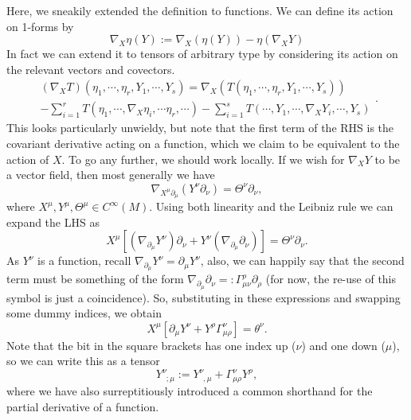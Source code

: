 \documentclass[11pt,fleqn]{report}
\begin{document}
Here, we sneakily extended the definition to functions. We can define its action on 1-forms by\begin{equation}
\nabla_X\eta(Y) := \nabla_X(\eta(Y))-\eta(\nabla_XY)
\end{equation}  In fact we can extend it to tensors of arbitrary type by considering its action on the relevant vectors and covectors.\begin{equation}\label{TheBigUn}
\begin{split}
(\nabla_XT)(\eta_1,\cdots,\eta_r,Y_1,\cdots,Y_s)=\nabla_X(T(\eta_1,\cdots,\eta_r,Y_1,\cdots,Y_s))\\ 
-\sum_{i=1}^rT(\eta_1,\cdots,\nabla_X\eta_i,\cdots\eta_r,\cdots) - \sum_{i=1}^sT(\cdots,Y_1,\cdots,\nabla_XY_i,\cdots,Y_s)
\end{split}.
\end{equation}
This looks particularly unwieldy, but note that the first term of the RHS is the covariant derivative acting on a function, which we claim to be equivalent to the action of $X$. To go any further, we should work locally. If we wish for $\nabla_XY$ to be a vector field, then most generally we have\begin{equation}
\nabla_{X^\mu\partial_\mu}(Y^\nu\partial_\nu) = \Theta^\nu \partial_\nu,
\end{equation}
where $X^\mu,Y^\mu,\Theta^\mu \in C^\infty(M)$. Using both linearity and the Leibniz rule we can expand the LHS as\begin{equation}
X^\mu\left[(\nabla_{\partial_\mu}Y^\nu)\partial_\nu +Y^\nu(\nabla_{\partial_\mu}\partial_\nu)\right] = \Theta^\nu\partial_\nu.
\end{equation}
As $Y^\nu$ is a function, recall $\nabla_{\partial_\mu}Y^\nu=\partial_\mu Y^\nu$, also, we can happily say that the second term must be something of the form $\nabla_{\partial_\mu}\partial_\nu=:\Gamma_{\mu\nu}^\rho\partial_\rho$ (for now, the re-use of this symbol is just a coincidence). So, substituting in these expressions and swapping some dummy indices, we obtain \begin{equation}
X^\mu\left[\partial_\mu Y^\nu+Y^\rho\Gamma^\nu_{\mu\rho}\right] = \theta^\nu.
\end{equation}
Note that the bit in the square brackets has one index up ($\nu$) and one down ($\mu$), so we can write this as a tensor\begin{equation}
Y^\nu_{\phantom\nu;\mu}:=Y^\nu_{\phantom v ,\mu}+\Gamma^\nu_{\mu\rho}Y^\rho,
\end{equation}
where we have also surreptitiously introduced a common shorthand for the partial derivative of a function.
\end{document}
